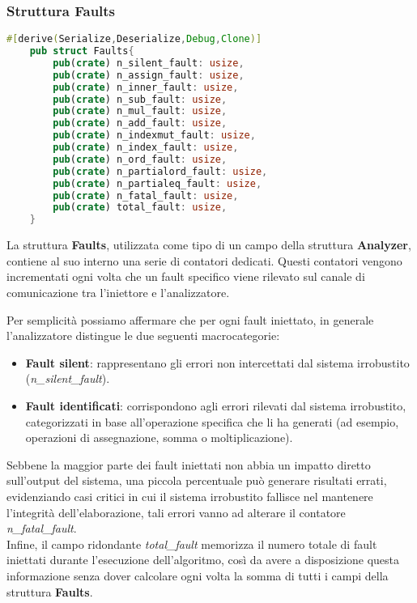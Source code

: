 \subsubsection{Struttura Faults}
\begin{lstlisting}[language=rust, style=boxed]
    #[derive(Serialize,Deserialize,Debug,Clone)]
    pub struct Faults{
        pub(crate) n_silent_fault: usize,
        pub(crate) n_assign_fault: usize,
        pub(crate) n_inner_fault: usize,
        pub(crate) n_sub_fault: usize,
        pub(crate) n_mul_fault: usize,
        pub(crate) n_add_fault: usize,
        pub(crate) n_indexmut_fault: usize,
        pub(crate) n_index_fault: usize,
        pub(crate) n_ord_fault: usize,
        pub(crate) n_partialord_fault: usize,
        pub(crate) n_partialeq_fault: usize,
        pub(crate) n_fatal_fault: usize,
        pub(crate) total_fault: usize,
    }
\end{lstlisting}
La struttura \textbf{Faults}, utilizzata come tipo di un campo della struttura \textbf{Analyzer}, contiene al suo interno una serie di contatori dedicati. Questi contatori vengono incrementati ogni volta che un fault specifico viene rilevato sul canale di comunicazione tra l'iniettore e l'analizzatore.

Per semplicità possiamo affermare che per ogni fault iniettato, in generale l'analizzatore distingue le due seguenti macrocategorie:
\begin{itemize}
    \item \textbf{Fault silent}: rappresentano gli errori non intercettati dal sistema irrobustito (\textit{n\_silent\_fault}).
    \item \textbf{Fault identificati}: corrispondono agli errori rilevati dal sistema irrobustito, categorizzati in base all'operazione specifica che li ha generati (ad esempio, operazioni di assegnazione, somma o moltiplicazione).
\end{itemize}

Sebbene la maggior parte dei fault iniettati non abbia un impatto diretto sull'output del sistema, una piccola percentuale può generare risultati errati, evidenziando casi critici in cui il sistema irrobustito fallisce nel mantenere l'integrità dell'elaborazione, tali errori vanno ad alterare il contatore \textit{n\_fatal\_fault}. \\
Infine, il campo ridondante \textit{total\_fault} memorizza il numero totale di fault iniettati durante l'esecuzione dell'algoritmo, così da avere a disposizione questa informazione senza dover calcolare ogni volta la somma di tutti i campi della struttura \textbf{Faults}.

